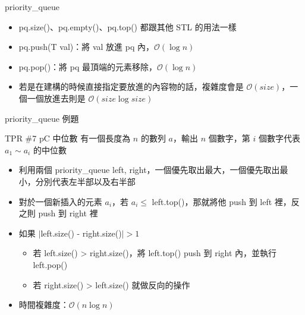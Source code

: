 \documentclass[aspectratio=169]{beamer}
\begin{document}
    \begin{frame}{priority\_queue}
        \begin{itemize}
            \item<1-> pq.size()、pq.empty()、pq.top() 都跟其他 STL 的用法一樣
            \item<2-> pq.push(T val)：將 val 放進 pq 內，$\mathcal{O}(\log n)$
            \item<2-> pq.pop()：將 pq 最頂端的元素移除，$\mathcal{O}(\log n)$
            \item<3-> 若是在建構的時候直接指定要放進的內容物的話，複雜度會是 $\mathcal{O}(size)$，一個一個放進去則是 $\mathcal{O}(size \log size)$
        \end{itemize}
    \end{frame}

    \begin{frame}{priority\_queue 例題}
        \begin{block}{TPR \#7 pC 中位數}
            有一個長度為 $n$ 的數列 $a$，輸出 $n$ 個數字，第 $i$ 個數字代表 $a_1 \sim a_i$ 的中位數
        \end{block}

        \begin{itemize}
            \item<2-> 利用兩個 priority\_queue left, right，一個優先取出最大，一個優先取出最小，分別代表左半部以及右半部
            \item<3-> 對於一個新插入的元素 $a_i$，若 $a_i \le$ left.top()，那就將他 push 到 left 裡，反之則 push 到 right 裡
            \item<4-> 如果 $\mid$left.size() - right.size()$\mid > 1$
                \begin{itemize}
                    \item<5-> 若 left.size() > right.size()，將 left.top() push 到 right 內，並執行 left.pop()
                    \item<5-> 若 right.size() > left.size() 就做反向的操作
                \end{itemize}
            \item<6-> 時間複雜度：$\mathcal{O}(n\log n)$
        \end{itemize}
    \end{frame}
\end{document}
